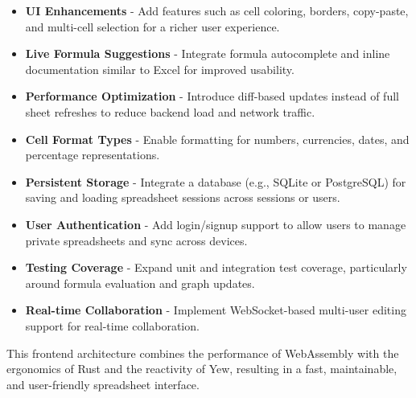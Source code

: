 \begin{itemize}
    \item \textbf{UI Enhancements} - Add features such as cell coloring, borders, copy-paste, and multi-cell selection for a richer user experience.
    
    \item \textbf{Live Formula Suggestions} - Integrate formula autocomplete and inline documentation similar to Excel for improved usability.
    
    \item \textbf{Performance Optimization} - Introduce diff-based updates instead of full sheet refreshes to reduce backend load and network traffic.
    
    \item \textbf{Cell Format Types} - Enable formatting for numbers, currencies, dates, and percentage representations.
    
    \item \textbf{Persistent Storage} - Integrate a database (e.g., SQLite or PostgreSQL) for saving and loading spreadsheet sessions across sessions or users.
    
    \item \textbf{User Authentication} - Add login/signup support to allow users to manage private spreadsheets and sync across devices.
    
    \item \textbf{Testing Coverage} - Expand unit and integration test coverage, particularly around formula evaluation and graph updates.
    
    \item \textbf{Real-time Collaboration} - Implement WebSocket-based multi-user editing support for real-time collaboration.
\end{itemize}


This frontend architecture combines the performance of WebAssembly with the ergonomics of Rust and the reactivity of Yew, resulting in a fast, maintainable, and user-friendly spreadsheet interface.
